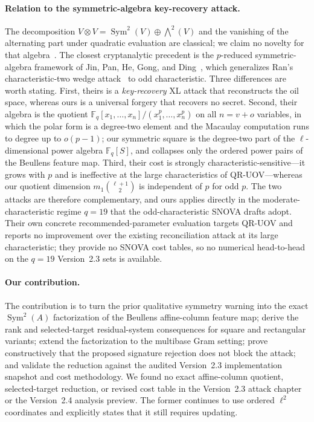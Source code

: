 \documentclass[11pt]{article}
\newcommand{\F}{\mathbb F}
\newcommand{\Sym}{\operatorname{Sym}}
\newcommand{\SNOVA}{\textsf{SNOVA}}
\newcommand{\QRUOV}{\textsf{QR-UOV}}
\begin{document}
\paragraph{Relation to the symmetric-algebra key-recovery attack.}
The decomposition
$V\otimes V=\Sym^2(V)\oplus\bigwedge^2(V)$ and the vanishing of the alternating
part under quadratic evaluation are classical; we claim no novelty for that
algebra~\cite{Lam2005}.  The closest cryptanalytic precedent is the
$p$-reduced symmetric-algebra framework of Jin, Pan, He, Gong, and
Ding~\cite{JinEtAl2026}, which generalizes Ran's characteristic-two wedge
attack~\cite{Ran2026} to odd characteristic.  Three differences are worth
stating.  First, theirs is a \emph{key-recovery} XL attack that reconstructs the
oil space, whereas ours is a universal forgery that recovers no secret.  Second,
their algebra is the quotient $\F_q[x_1,\dots,x_n]/(x_1^p,\dots,x_n^p)$ on all
$n=v+o$ variables, in which the polar form is a degree-two element and the
Macaulay computation runs to degree up to $o(p-1)$; our symmetric square is the
degree-two part of the $\ell$-dimensional power algebra $\F_q[S]$, and collapses
only the ordered power pairs of the Beullens feature map.  Third, their cost is
strongly characteristic-sensitive---it grows with $p$ and is ineffective at the
large characteristics of \QRUOV{}---whereas our quotient dimension
$m_1\binom{\ell+1}{2}$ is independent of $p$ for odd $p$.  The two attacks are
therefore complementary, and ours applies directly in the moderate-characteristic
regime $q=19$ that the odd-characteristic \SNOVA{} drafts adopt.  Their own
concrete recommended-parameter evaluation targets \QRUOV{} and reports no
improvement over the existing reconciliation attack at its large characteristic;
they provide no \SNOVA{} cost tables, so no numerical head-to-head on the $q=19$
Version~2.3 sets is available.

\paragraph{Our contribution.}
The contribution is to turn the prior qualitative symmetry warning into the exact
$\Sym^2(A)$ factorization of the Beullens affine-column feature map; derive the
rank and selected-target residual-system consequences for square and rectangular
variants; extend the factorization to the multibase Gram setting; prove
constructively that the proposed signature rejection does not block the attack;
and validate the reduction against the audited Version~2.3 implementation
snapshot and cost methodology.  We found no exact affine-column quotient,
selected-target reduction, or revised cost table in the Version~2.3 attack
chapter or the Version~2.4 analysis preview.  The former continues to use
ordered $\ell^2$ coordinates and explicitly states that it still requires updating.
\end{document}
